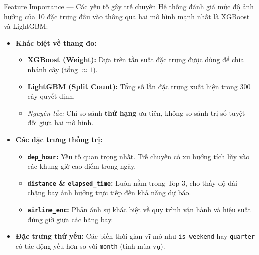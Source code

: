 \begin{frame}{Feature Importance --- Các yếu tố gây trễ chuyến}
  Hệ thống đánh giá mức độ ảnh hưởng của 10 đặc trưng đầu vào thông qua hai mô hình mạnh nhất là XGBoost và LightGBM:
  
  \begin{itemize}
      \item \textbf{Khác biệt về thang đo:}
      \begin{itemize}
        \item \textbf{XGBoost (Weight):} Dựa trên tần suất đặc trưng được dùng để chia nhánh cây (tổng $\approx 1$).
        \item \textbf{LightGBM (Split Count):} Tổng số lần đặc trưng xuất hiện trong 300 cây quyết định.
        \item \textit{Nguyên tắc:} Chỉ so sánh \textbf{thứ hạng} ưu tiên, không so sánh trị số tuyệt đối giữa hai mô hình.
      \end{itemize}
  
      \item \textbf{Các đặc trưng thống trị:}
      \begin{itemize}
        \item \textbf{\texttt{dep\_hour}:} Yếu tố quan trọng nhất. Trễ chuyến có xu hướng tích lũy vào các khung giờ cao điểm trong ngày.
        \item \textbf{\texttt{distance} \& \texttt{elapsed\_time}:} Luôn nằm trong Top 3, cho thấy độ dài chặng bay ảnh hưởng trực tiếp đến khả năng dự báo.
        \item \textbf{\texttt{airline\_enc}:} Phản ánh sự khác biệt về quy trình vận hành và hiệu suất đúng giờ giữa các hãng bay.
      \end{itemize}
  
      \item \textbf{Đặc trưng thứ yếu:} Các biến thời gian vĩ mô như \texttt{is\_weekend} hay \texttt{quarter} có tác động yếu hơn so với \texttt{month} (tính mùa vụ).
  \end{itemize}
\end{frame}

